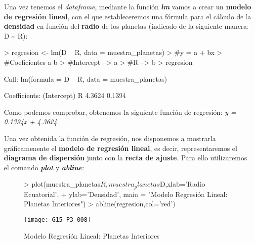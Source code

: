 \documentclass [a4paper] {article}
\begin{document}
Una vez tenemos el \textit{dataframe}, mediante la función \textbf{\textit{lm}} vamos a crear un \textbf{modelo de regresión lineal},
con el que estableceremos una fórmula para el cálculo de la \textbf{densidad} en función del \textbf{radio} de los planetas (indicado
de la siguiente manera: D \textasciitilde{} R):
\begin{Schunk}
\begin{Sinput}
> regresion <- lm(D ~ R, data = muestra_planetas)
> #y = a + bx
> #Coeficientes a b
> #Intercept --> a
> #R --> b
> regresion
\end{Sinput}
\begin{Soutput}
Call:
lm(formula = D ~ R, data = muestra_planetas)

Coefficients:
(Intercept)            R  
     4.3624       0.1394  
\end{Soutput}
\end{Schunk}

Como podemos comprobar, obtenemos la siguiente función de regresión: \textit{y = 0.1394x + 4.3624}.

\newpage

Una vez obtenida la función de regresión, nos disponemos a mostrarla gráficamenente el \textbf{modelo de regresión lineal}, es decir,
representaremos el \textbf{diagrama de dispersión} junto con la \textbf{recta de ajuste}. Para ello utilizaremos el comando \textbf{\textit{plot}}
y \textbf{\textit{abline}}:
\begin{figure}[h!]
\centering
\begin{Schunk}
\begin{Sinput}
>  plot(muestra_planetas$R,muestra_planetas$D,xlab='Radio Ecuatorial',
+       ylab='Densidad', main = "Modelo Regresión Lineal: Planetas Interiores")
>  abline(regresion,col='red')
\end{Sinput}
\end{Schunk}
\texttt{[image: G15-P3-008]}
\caption{Modelo Regresión Lineal: Planetas Interiores}
\end{figure}

\newpage
\end{document}
